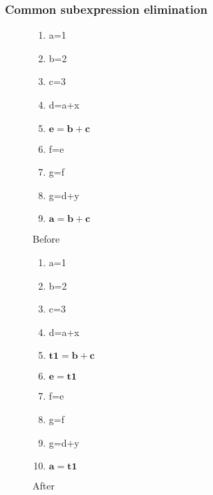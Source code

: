 \documentclass[a4paper]{article}
\begin{document}
\subsubsection{Common subexpression elimination}
        \begin{figure}[H]
            \centering
            \begin{varwidth}[b]{0.45\linewidth}
                \begin{enumerate}[1.]
                    \item a=1
                    \item b=2
                    \item c=3
                    \item d=a+x
                    \item {\color{red}$\mathbf{e=b+c}$}
                    \item f=e
                    \item g=f
                    \item g=d+y
                    \item {\color{red}$\mathbf{a=b+c}$}
                \end{enumerate}
                \caption{Before}
            \end{varwidth}
            \begin{varwidth}[b]{0.45\linewidth}
                \begin{enumerate}[1.]
                    \item a=1
                    \item b=2
                    \item c=3
                    \item d=a+x
                    \item {\color{red}$\mathbf{t1=b+c}$}
                    \item {\color{red}$\mathbf{e=t1}$}
                    \item f=e
                    \item g=f
                    \item g=d+y
                    \item {\color{red}$\mathbf{a=t1}$}
                \end{enumerate}
                \caption{After}
            \end{varwidth}
        \end{figure}
\end{document}

